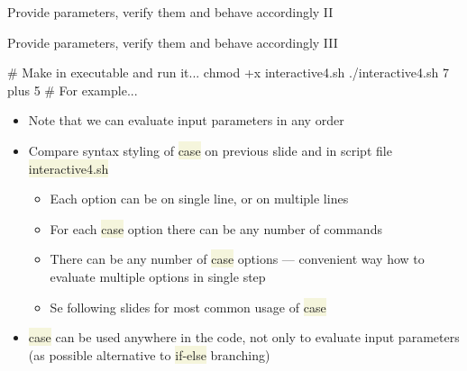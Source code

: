 \documentclass[compress, xelatex, 11pt, xcolor=svgnames, aspectratio=169, url={hyphens, lowtilde}]{beamer}
\renewcommand{\texttt}[1]{\colorbox{Beige}{{\ttfamily #1}}}
\begin{document}
\begin{frame}[fragile]{Provide parameters, verify them and behave accordingly II}
\end{frame}

\begin{frame}[fragile]{Provide parameters, verify them and behave accordingly III}
	\begin{bashcode}
    # Make in executable and run it...
    chmod +x interactive4.sh
    ./interactive4.sh 7 plus 5 # For example...
	\end{bashcode}
	\vfill
	\begin{itemize}
		\item Note that we can evaluate input parameters in any order
		\item Compare syntax styling of \texttt{case} on previous slide and in script file \texttt{interactive4.sh}
		\begin{itemize}
			\item Each option can be on single line, or on multiple lines
			\item For each \texttt{case} option there can be any number of commands
			\item There can be any number of \texttt{case} options --- convenient way how to evaluate multiple options in single step
			\item Se following slides for most common usage of \texttt{case}
		\end{itemize}
		\item \texttt{case} can be used anywhere in the code, not only to evaluate input parameters (as possible alternative to \texttt{if-else} branching)
	\end{itemize}
\end{frame}
\end{document}
